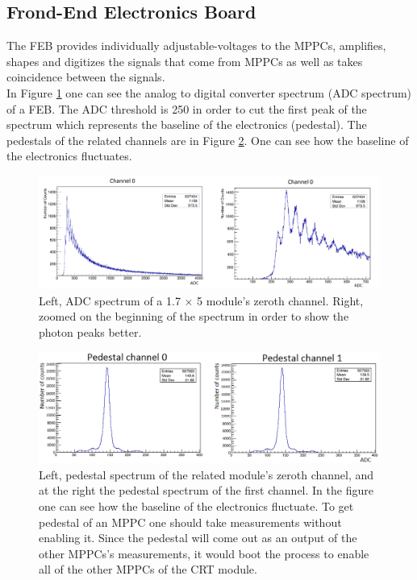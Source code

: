 \documentclass[a4paper]{article}\linespread{1.4}
\begin{document}
\subsection{Frond-End Electronics Board}
The FEB provides individually adjustable-voltages to the MPPCs, amplifies, shapes and digitizes the signals that come from MPPCs as well as takes coincidence between the signals. 
\\In Figure \ref{fig:cp} one can see the analog to digital converter spectrum (ADC spectrum) of a FEB. The ADC threshold is 250 in order to cut the first peak of the spectrum which represents the baseline of the electronics (pedestal). The pedestals of the related channels are in Figure \ref{fig:pd}. One can see how the baseline of the electronics fluctuates.
\begin{figure}[h!] \centering \includegraphics[width=130mm,scale=1.0]{cp.png} \caption{Left, ADC spectrum of a 1.7 $\times$ 5 module's zeroth channel. Right, zoomed on the beginning of the spectrum in order to show the photon peaks better. }\label{fig:cp} \end{figure}
\begin{figure}[h!] \centering \includegraphics[width=130mm,scale=1.0]{pd.png} \caption{Left, pedestal spectrum of the related module's zeroth channel, and at the right the pedestal spectrum of the first channel. In the figure one can see how the baseline of the electronics fluctuate. To get pedestal of an MPPC one should take measurements without enabling it. Since the pedestal will come out as an output of the other MPPCs's measurements, it would boot the process to enable all of the other MPPCs of the CRT module.} \label{fig:pd}\end{figure}
\end{document}
